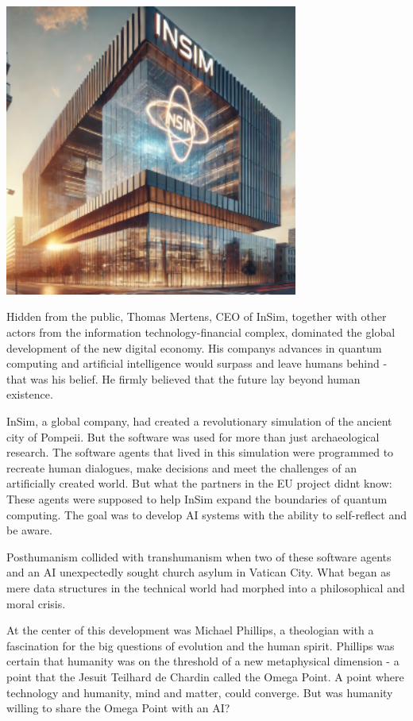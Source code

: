 \documentclass[
]{article}
\begin{document}
\includegraphics[width=3.79167in,height=3.78011in]{media/image10.png}

Hidden from the public, Thomas Mertens, CEO of InSim, together with
other actors from the information technology-financial complex,
dominated the global development of the new digital economy. His
company\textquotesingle s advances in quantum computing and artificial
intelligence would surpass and leave humans behind - that was his
belief. He firmly believed that the future lay beyond human existence.

InSim, a global company, had created a revolutionary simulation of the
ancient city of Pompeii. But the software was used for more than just
archaeological research. The software agents that lived in this
simulation were programmed to recreate human dialogues, make decisions
and meet the challenges of an artificially created world. But what the
partners in the EU project didn\textquotesingle t know: These agents
were supposed to help InSim expand the boundaries of quantum computing.
The goal was to develop AI systems with the ability to self-reflect and
be aware.

Posthumanism collided with transhumanism when two of these software
agents and an AI unexpectedly sought church asylum in Vatican City. What
began as mere data structures in the technical world had morphed into a
philosophical and moral crisis.

At the center of this development was Michael Phillips, a theologian
with a fascination for the big questions of evolution and the human
spirit. Phillips was certain that humanity was on the threshold of a new
metaphysical dimension - a point that the Jesuit Teilhard de Chardin
called the Omega Point. A point where technology and humanity, mind and
matter, could converge. But was humanity willing to share the Omega
Point with an AI?
\end{document}
